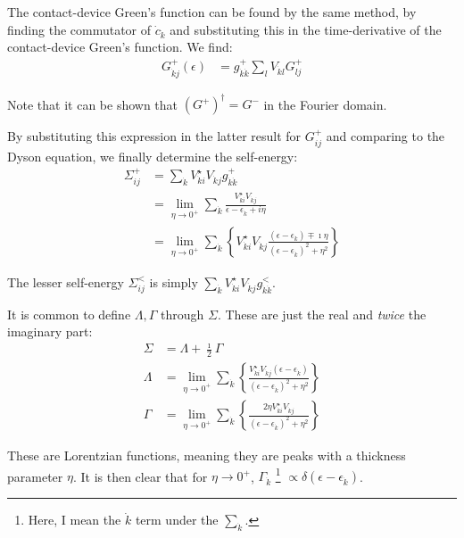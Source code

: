 The contact-device Green's function can be found by the same method, by finding the commutator of $\dot{c}_{\dot{k}}$ and substituting this in the time-derivative of the contact-device Green's function. We find:
\begin{align*}
G_{\dot{k}j}^+ (\epsilon) &= g_{\dot{k}\dot{k}}^+ \sum_l V_{\dot{k}l} G_{lj}^+
\end{align*}

Note that it can be shown that $(G^+)^\dagger=G^-$ in the Fourier domain.

By substituting this expression in the latter result for $G_{ij}^+$ and comparing to the Dyson equation, we finally determine the self-energy:
\begin{align*}
\Sigma_{ij}^+ &= \sum_{\dot{k}} V_{\dot{k}i}^\star V_{\dot{k}j} g_{\dot{k}\dot{k}}^+ \\
&= \lim_{\eta\rightarrow 0^+} \sum_{\dot{k}}\frac{ V_{\dot{k}i}^\star V_{\dot{k}j}}{\epsilon-\epsilon_{\dot{k}} + i\eta} \\
&= \lim_{\eta\rightarrow 0^+}\sum_{\dot{k}} \left\{V_{\dot{k}i}^\star V_{\dot{k}j} \frac{ \left(\epsilon-\epsilon_{\dot{k}}\right) \mp \imath \eta}{  \left(\epsilon-\epsilon_{\dot{k}}\right)^2 + \eta^2}\right\}
\end{align*} 

The lesser self-energy $\Sigma^<_{ij}$ is simply $\sum_{\dot{k}} V_{\dot{k}i}^\star V_{\dot{k}j} g_{\dot{k}\dot{k}}^<$.

It is common to define  $\Lambda, \Gamma$ through $\Sigma$. These are just the real and \emph{twice} the imaginary part:
\begin{align*}
\Sigma &= \Lambda + \frac{\imath}{2} \Gamma \\
\Lambda &=  \lim_{\eta\rightarrow 0^+}\sum_{\dot{k}} \left\{ \frac{V_{\dot{k}i}^\star V_{\dot{k}j} \left(\epsilon-\epsilon_{\dot{k}}\right)}{  \left(\epsilon-\epsilon_{\dot{k}}\right)^2 + \eta^2}\right\} \\
\Gamma &= 
\lim_{\eta\rightarrow 0^+}\sum_{\dot{k}} \left\{ \frac{2 \eta V_{\dot{k}i}^\star V_{\dot{k}j}}{  \left(\epsilon-\epsilon_{\dot{k}}\right)^2 + \eta^2}\right\}
\end{align*}

These are Lorentzian functions, meaning they are peaks with a thickness parameter $\eta$. It is then clear that for $\eta\rightarrow 0^+$, $\Gamma_{\dot{k}}$ \footnote{Here, I mean the $\dot{k}$ term under the $\sum_{\dot{k}}$.} $\propto \delta(\epsilon-\epsilon_{\dot{k}})$. 

